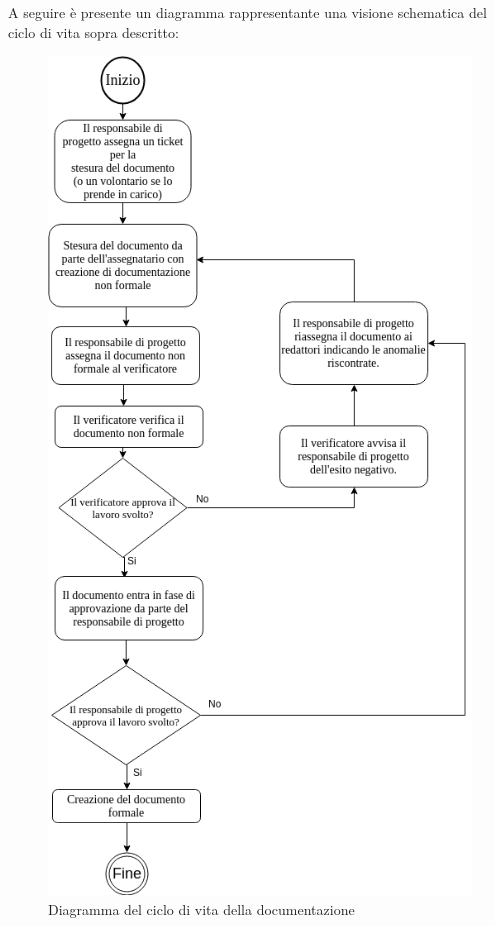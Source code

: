 A seguire è presente un diagramma rappresentante una visione schematica del ciclo di vita sopra descritto:
\begin{figure}[h!]
  \begin{center}
  \includegraphics[scale=0.45]{immagini/Dfd.png}
  \caption{Diagramma del ciclo di vita della documentazione}
  \end{center}
\end{figure}

